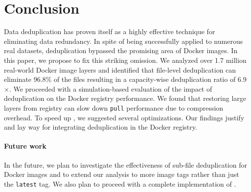 \section{Conclusion}
\label{sec:conclusion}

Data deduplication has proven itself as a highly effective technique for
eliminating data redundancy.
%
In spite of being successfully applied to numerous real datasets, deduplication
bypassed the promising area of Docker images.
%
In this paper, we propose to fix this striking omission.
%
We analyzed over 1.7 million real-world Docker image layers and identified that
file-level deduplication can eliminate 96.8\% of the files resulting in
a capacity-wise deduplication ratio of 6.9$\times$.
%
We proceeded with a simulation-based evaluation of the impact of deduplication
on the Docker registry performance.
%
We found that restoring large layers from registry can slow down \texttt{pull}
performance due to compression overhead. To speed up \sysname, we suggested several
optimizations.
%
%
Our findings justify and lay way for integrating deduplication in the Docker registry.

\paragraph{Future work}
%
In the future, we plan to investigate the effectiveness of sub-file deduplication for
Docker images and to extend our analysis to more image tags rather than just the \texttt{latest} tag.
%
We also plan to proceed with a complete implementation of \sysname.

